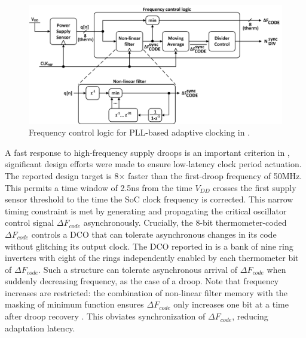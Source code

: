 \documentclass[twoside,9pt,journal,letterpage]{IEEEtran}
\begin{document}
\begin{figure}[h]
	\centering
	\includegraphics[width=\columnwidth]{fig_detail_pll}
	\caption{Frequency control logic for PLL-based adaptive clocking in \cite{hashimoto2018}.}
	\label{fig:detail_pll}
\end{figure}


A fast response to high-frequency supply droops is an important criterion in \cite{hashimoto2018}, significant design efforts were made to ensure low-latency clock period actuation. The reported design target is 8$\times$ faster than the first-droop frequency of 50MHz. This permits a time window of 2.5ns from the time $V_{DD}$ crosses the first supply sensor threshold to the time the SoC clock frequency is corrected. This narrow timing constraint is met by generating and propagating the critical oscillator control signal $\Delta F_{code}$ asynchronously. Crucially, the 8-bit thermometer-coded $\Delta F_{code}$ controls a DCO that can tolerate asynchronous changes in its code without glitching its output clock. The DCO reported in \cite{hashimoto2018} is a bank of nine ring inverters with eight of the rings independently enabled by each thermometer bit of $\Delta F_{code}$. Such a structure can tolerate asynchronous arrival of $\Delta F_{code}$ when suddenly decreasing frequency, as the case of a droop. Note that frequency increases are restricted: the combination of non-linear filter memory with the masking of minimum function ensures $\Delta F_{code}$ only increases one bit at a time after droop recovery \cite{hashimoto2018}. This obviates synchronization of $\Delta F_{code}$, reducing adaptation latency.
\end{document}
